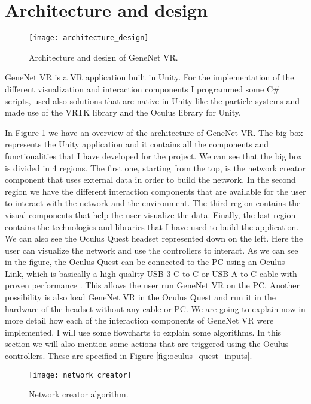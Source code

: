 \section{Architecture and design}

\begin{figure}[h!]
    \centering%
    \texttt{[image: architecture\_design]}
    \caption{Architecture and design of GeneNet VR.}
    \label{fig:architecture_design}
\end{figure}%

GeneNet VR is a VR application built in Unity. For the implementation of the different visualization and interaction components I programmed some C\# scripts, used also solutions that are native in Unity like the particle systems and made use of the VRTK library and the Oculus library for Unity.

In Figure \ref{fig:architecture_design} we have an overview of the architecture of GeneNet VR. The big box represents the Unity application and it contains all the components and functionalities that I have developed for the project. We can see that the big box is divided in 4 regions. The first one, starting from the top, is the network creator component that uses external data in order to build the network. In the second region we have the different interaction components that are available for the user to interact with the network and the environment. The third region contains the visual components that help the user visualize the data. Finally, the last region contains the technologies and libraries that I have used to build the application. We can also see the Oculus Quest headset represented down on the left. Here the user can visualize the network and use the controllers to interact. As we can see in the figure, the Oculus Quest can be connected to the PC using an Oculus Link, which is basically a high-quality USB 3 C to C or USB A to C cable with proven performance \cite{oculus_link}. This allows the user run GeneNet VR on the PC. Another possibility is also load GeneNet VR in the Oculus Quest and run it in the hardware of the headset without any cable or PC. We are going to explain now in more detail how each of the interaction components of GeneNet VR were implemented. I will use some flowcharts to explain some algorithms. In this section we will also mention some actions that are triggered using the Oculus controllers. These are specified in Figure \ref{fig:oculus_quest_inputs}.

\begin{figure}[h!]
    \centering%
    \texttt{[image: network\_creator]}
    \caption{Network creator algorithm.}
    \label{fig:network_creator}
\end{figure}%

